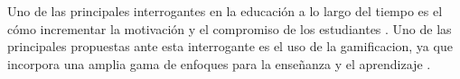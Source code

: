 






 Uno de las principales interrogantes en la educación a lo largo del tiempo es el cómo incrementar la motivación
 y el compromiso de los estudiantes \cite{Lee}. Uno de las principales propuestas ante esta interrogante es el
 uso de la \gls{gamificacion}, ya que incorpora una amplia gama de enfoques para la enseñanza y el aprendizaje
 \cite{Aldemir}.\\

